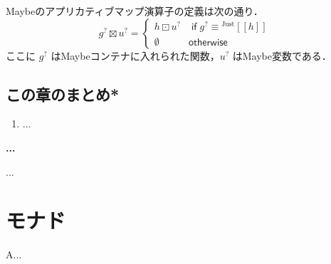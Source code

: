 \documentclass[a4paper,twocolumn]{jsbook}
\def\[{\left[\!\left[}
\def\]{\right]\!\right]}
\newenvironment{leader}{\begingroup\gt}{\endgroup}
\newenvironment{note}[1]{\begin{boxnote}\begin{center}\textbf{#1}\end{center}}{\end{boxnote}}
\newcommand{\mKeyword}[1]{\mathsf{#1}} %
\newcommand{\mIfKeyword}{\mKeyword{if}}
\newcommand{\mOtherwiseKeyword}{\mKeyword{otherwise}}
\DeclareMathOperator{\mIf}{\mIfKeyword}
\DeclareMathOperator{\mOtherwise}{\mOtherwiseKeyword}
\newcommand{\mNothing}{\emptyset}
\DeclareMathOperator{\mAppMapMaybe}{\boxtimes}
\DeclareMathOperator{\mLogicalAnd}{\wedge}
\DeclareMathOperator{\mMapMaybe}{\boxdot}
\newcommand{\mGenericValueConstructor}[1]{\mathrm{#1}}
\newcommand{\mGenericWith}[2]{{}^\mGenericValueConstructor{#1}\[#2\]}
\newcommand{\mJustWith}[1]{\mGenericWith{Just}{#1}}
\newcommand{\mMaybe}[1]{{#1}^?}
\begin{document}
Maybeのアプリカティブマップ演算子の定義は次の通り．
\begin{equation}
\label{eq:maybe-applicative-map-by-maybe-map}
\mMaybe{g}\mAppMapMaybe\mMaybe{u}
=\begin{cases}
h\mMapMaybe\mMaybe{u}&\mIf\mMaybe{g}\equiv\mJustWith{h}\\
\mNothing&\mOtherwise
\end{cases}
\end{equation}
ここに $\mMaybe{g}$ はMaybeコンテナに入れられた関数，$\mMaybe{u}$ はMaybe変数である．

\section{この章のまとめ*}

\begin{enumerate}
\item ...
\end{enumerate}


\begin{note}{...}
...
% 
\end{note}



\chapter{モナド}
\label{ch:monad}

\begin{leader}
A...
\end{leader}
\end{document}
